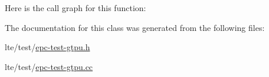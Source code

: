 Here is the call graph for this function\+:




The documentation for this class was generated from the following files\+:\begin{DoxyCompactItemize}
\item 
lte/test/\hyperlink{epc-test-gtpu_8h}{epc-\/test-\/gtpu.\+h}\item 
lte/test/\hyperlink{epc-test-gtpu_8cc}{epc-\/test-\/gtpu.\+cc}\end{DoxyCompactItemize}
